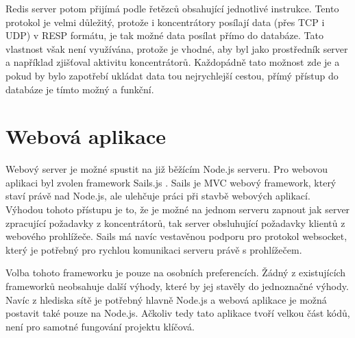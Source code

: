 Redis server potom přijímá podle řetězců obsahující jednotlivé instrukce. Tento protokol je velmi důležitý, protože i koncentrátory posílají data (přes TCP i UDP) v RESP formátu, je tak možné data posílat přímo do databáze. Tato vlastnost však není využívána, protože je vhodné, aby byl jako prostředník server a například zjišťoval aktivitu koncentrátorů. Každopádně tato možnost zde je a pokud by bylo zapotřebí ukládat data tou nejrychlejší cestou, přímý přístup do databáze je tímto možný a funkční.

\section{Webová aplikace}
Webový server je možné spustit na již běžícím Node.js serveru. Pro webovou aplikaci byl zvolen framework Sails.js \cite{sails}. Sails je MVC webový framework, který staví právě nad Node.js, ale ulehčuje práci při stavbě webových aplikací. Výhodou tohoto přístupu je to, že je možné na jednom serveru zapnout jak server zpracující požadavky z koncentrátorů, tak server obsluhující požadavky klientů z webového prohlížeče. Sails má navíc vestavěnou podporu pro protokol websocket, který je potřebný pro rychlou komunikaci serveru právě s prohlížečem.

Volba tohoto frameworku je pouze na osobních preferencích. Žádný z existujících frameworků neobsahuje další výhody, které by jej stavěly do jednoznačné výhody. Navíc z hlediska sítě je potřebný hlavně Node.js a webová aplikace je možná postavit také pouze na Node.js. Ačkoliv tedy tato aplikace tvoří velkou část kódů, není pro samotné fungování projektu klíčová.